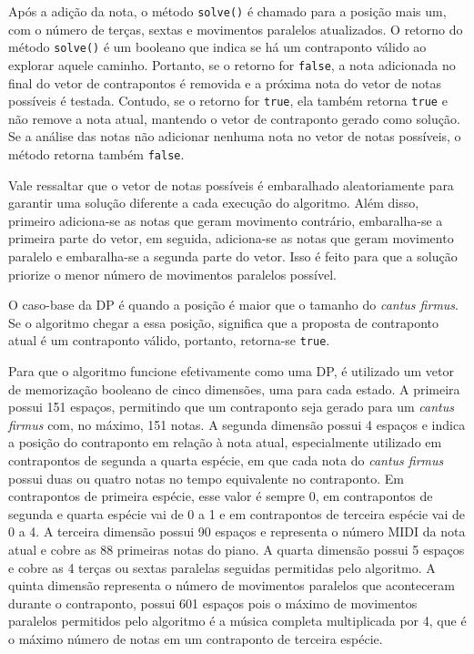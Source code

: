     Após a adição da nota, o método \texttt{solve()} é chamado para a posição mais um, com o número de terças, sextas e movimentos paralelos atualizados. O retorno do método \texttt{solve()} é um booleano que indica se há um contraponto válido ao explorar aquele caminho. Portanto, se o retorno for \texttt{false}, a nota adicionada no final do vetor de contrapontos é removida e a próxima nota do vetor de notas possíveis é testada. Contudo, se o retorno for \texttt{true}, ela também retorna \texttt{true} e não remove a nota atual, mantendo o vetor de contraponto gerado como solução. Se a análise das notas não adicionar nenhuma nota no vetor de notas possíveis, o método retorna também \texttt{false}.

    Vale ressaltar que o vetor de notas possíveis é embaralhado aleatoriamente para garantir uma solução diferente a cada execução do algoritmo. Além disso, primeiro adiciona-se as notas que geram movimento contrário, embaralha-se a primeira parte do vetor, em seguida, adiciona-se as notas que geram movimento paralelo e embaralha-se a segunda parte do vetor. Isso é feito para que a solução priorize o menor número de movimentos paralelos possível.

    O caso-base da DP é quando a posição é maior que o tamanho do \textit{cantus firmus}. Se o algoritmo chegar a essa posição, significa que a proposta de contraponto atual é um contraponto válido, portanto, retorna-se \texttt{true}.

    Para que o algoritmo funcione efetivamente como uma DP, é utilizado um vetor de memorização booleano de cinco dimensões, uma para cada estado. A primeira possui 151 espaços, permitindo que um contraponto seja gerado para um \textit{cantus firmus} com, no máximo, 151 notas. A segunda dimensão possui 4 espaços e indica a posição do contraponto em relação à nota atual, especialmente utilizado em contrapontos de segunda a quarta espécie, em que cada nota do \textit{cantus firmus} possui duas ou quatro notas no tempo equivalente no contraponto. Em contrapontos de primeira espécie, esse valor é sempre 0, em contrapontos de segunda e quarta espécie vai de 0 a 1 e em contrapontos de terceira espécie vai de 0 a 4. A terceira dimensão possui 90 espaços e representa o número MIDI da nota atual e cobre as 88 primeiras notas do piano. A quarta dimensão possui 5 espaços e cobre as 4 terças ou sextas paralelas seguidas permitidas pelo algoritmo. A quinta dimensão representa o número de movimentos paralelos que aconteceram durante o contraponto, possui 601 espaços pois o máximo de movimentos paralelos permitidos pelo algoritmo é a música completa multiplicada por 4, que é o máximo número de notas em um contraponto de terceira espécie.

